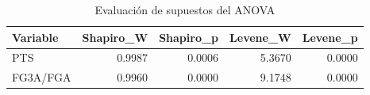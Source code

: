 \begin{table}
\caption{Evaluación de supuestos del ANOVA}
\label{tab:anova-supuestos}
\begin{tabular}{lrrrr}
\toprule
Variable & Shapiro_W & Shapiro_p & Levene_W & Levene_p \\
\midrule
PTS & 0.9987 & 0.0006 & 5.3670 & 0.0000 \\
FG3A/FGA & 0.9960 & 0.0000 & 9.1748 & 0.0000 \\
\bottomrule
\end{tabular}
\end{table}
